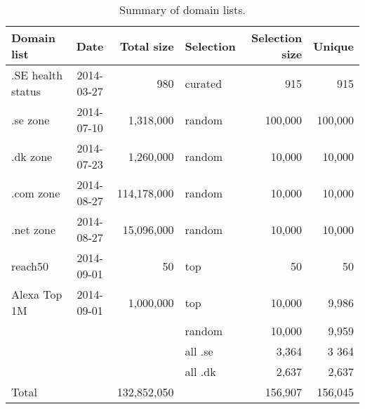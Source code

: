 \documentclass{sig-alternate-10pt}
\begin{document}
\begin{table*}[t]

\centering

\caption{Summary of domain lists.}

\label{tab:domains}

{\small

\begin{tabular}{|l|c|r|l|r|r|}\hline

\hline %

Domain list       & Date       & Total size  & Selection & Selection size & Unique\\\hline

.SE health status & 2014-03-27 & 980         & curated   & 915            & 915   \\\hline

.se zone          & 2014-07-10 & 1,318,000   & random    & 100,000        & 100,000 \\\hline

.dk zone          & 2014-07-23 & 1,260,000   & random    & 10,000         & 10,000 \\\hline

.com zone         & 2014-08-27 & 114,178,000 & random    & 10,000         & 10,000 \\\hline

.net zone         & 2014-08-27 & 15,096,000  & random    & 10,000         & 10,000 \\\hline

reach50           & 2014-09-01 & 50          & top       & 50             & 50 \\\hline

Alexa Top 1M      & 2014-09-01 & 1,000,000   & top       & 10,000         & 9,986 \\\hline

                  &            &             & random    & 10,000         & 9,959 \\\hline

                  &            &             & all .se   & 3,364          & 3 364 \\\hline

                  &            &             & all .dk   & 2,637          & 2,637 \\\hline

Total             &            & 132,852,050 &           & 156,907        & 156,045 \\\hline

\end{tabular}}

\vspace{-0pt}

\end{table*}
\end{document}
